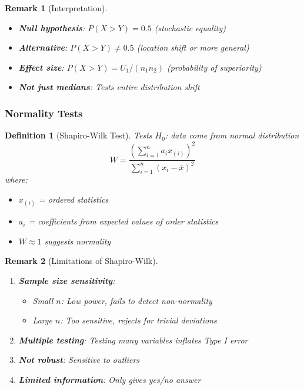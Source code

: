 \documentclass{article}
\newtheorem{definition}{Definition}
\newtheorem{remark}{Remark}
\begin{document}
\begin{remark}[Interpretation]
\begin{itemize}
    \item \textbf{Null hypothesis}: $P(X > Y) = 0.5$ (stochastic equality)
    \item \textbf{Alternative}: $P(X > Y) \neq 0.5$ (location shift or more general)
    \item \textbf{Effect size}: $P(X > Y) = U_1/(n_1 n_2)$ (probability of superiority)
    \item \textbf{Not just medians}: Tests entire distribution shift
\end{itemize}
\end{remark}

\subsubsection{Normality Tests}

\begin{definition}[Shapiro-Wilk Test]
Tests $H_0$: data come from normal distribution
\begin{equation}
W = \frac{\left(\sum_{i=1}^n a_i x_{(i)}\right)^2}{\sum_{i=1}^n (x_i - \bar{x})^2}
\end{equation}
where:
\begin{itemize}
    \item $x_{(i)}$ = ordered statistics
    \item $a_i$ = coefficients from expected values of order statistics
    \item $W \approx 1$ suggests normality
\end{itemize}
\end{definition}

\begin{remark}[Limitations of Shapiro-Wilk]
\begin{enumerate}
    \item \textbf{Sample size sensitivity}:
    \begin{itemize}
        \item Small $n$: Low power, fails to detect non-normality
        \item Large $n$: Too sensitive, rejects for trivial deviations
    \end{itemize}
    \item \textbf{Multiple testing}: Testing many variables inflates Type I error
    \item \textbf{Not robust}: Sensitive to outliers
    \item \textbf{Limited information}: Only gives yes/no answer
\end{enumerate}
\end{remark}
\end{document}
